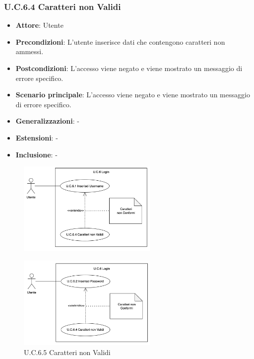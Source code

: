 \subsubsection{U.C.6.4 Caratteri non Validi}
\begin{itemize}
    \item \textbf{Attore}: Utente
    \item \textbf{Precondizioni}: L'utente inserisce dati che contengono caratteri non ammessi.
    \item \textbf{Postcondizioni}: L'accesso viene negato e viene mostrato un messaggio di errore specifico.
    \item \textbf{Scenario principale}: L'accesso viene negato e viene mostrato un messaggio di errore specifico.
    \item \textbf{Generalizzazioni}: -
    \item \textbf{Estensioni}: -
    \item \textbf{Inclusione}: -
\end{itemize}
\begin{figure}[H]
    \centering
    \includegraphics[width=0.6\textwidth]{img/NUOVO6.4.1.png}
\end{figure}
\begin{figure}[H]
    \centering
    \includegraphics[width=0.6\textwidth]{img/NUOVO6.4.2.png}
    \caption{U.C.6.5 Caratteri non Validi}
\end{figure}
\newpage

